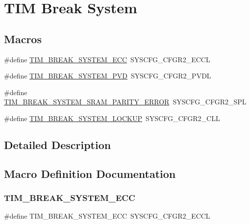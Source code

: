 \hypertarget{group___t_i_m___break___system}{}\section{T\+IM Break System}
\label{group___t_i_m___break___system}
\subsection*{Macros}
\begin{DoxyCompactItemize}
\item 
\#define \mbox{\hyperlink{group___t_i_m___break___system_ga353dd579e2ee67ce514f2bc218f64279}{T\+I\+M\+\_\+\+B\+R\+E\+A\+K\+\_\+\+S\+Y\+S\+T\+E\+M\+\_\+\+E\+CC}}~S\+Y\+S\+C\+F\+G\+\_\+\+C\+F\+G\+R2\+\_\+\+E\+C\+CL
\item 
\#define \mbox{\hyperlink{group___t_i_m___break___system_ga389af93f9a1789e7de509991ef23cfec}{T\+I\+M\+\_\+\+B\+R\+E\+A\+K\+\_\+\+S\+Y\+S\+T\+E\+M\+\_\+\+P\+VD}}~S\+Y\+S\+C\+F\+G\+\_\+\+C\+F\+G\+R2\+\_\+\+P\+V\+DL
\item 
\#define \mbox{\hyperlink{group___t_i_m___break___system_gaf359a8c2dde8fda9cb026926b8402dee}{T\+I\+M\+\_\+\+B\+R\+E\+A\+K\+\_\+\+S\+Y\+S\+T\+E\+M\+\_\+\+S\+R\+A\+M\+\_\+\+P\+A\+R\+I\+T\+Y\+\_\+\+E\+R\+R\+OR}}~S\+Y\+S\+C\+F\+G\+\_\+\+C\+F\+G\+R2\+\_\+\+S\+PL
\item 
\#define \mbox{\hyperlink{group___t_i_m___break___system_ga9b84149e41633c45c50c5cdcbbd63dc0}{T\+I\+M\+\_\+\+B\+R\+E\+A\+K\+\_\+\+S\+Y\+S\+T\+E\+M\+\_\+\+L\+O\+C\+K\+UP}}~S\+Y\+S\+C\+F\+G\+\_\+\+C\+F\+G\+R2\+\_\+\+C\+LL
\end{DoxyCompactItemize}


\subsection{Detailed Description}


\subsection{Macro Definition Documentation}
\mbox{\label{group___t_i_m___break___system_ga353dd579e2ee67ce514f2bc218f64279}} 
\subsubsection{\texorpdfstring{TIM\_BREAK\_SYSTEM\_ECC}{TIM\_BREAK\_SYSTEM\_ECC}}
{\footnotesize\ttfamily \#define T\+I\+M\+\_\+\+B\+R\+E\+A\+K\+\_\+\+S\+Y\+S\+T\+E\+M\+\_\+\+E\+CC~S\+Y\+S\+C\+F\+G\+\_\+\+C\+F\+G\+R2\+\_\+\+E\+C\+CL}

